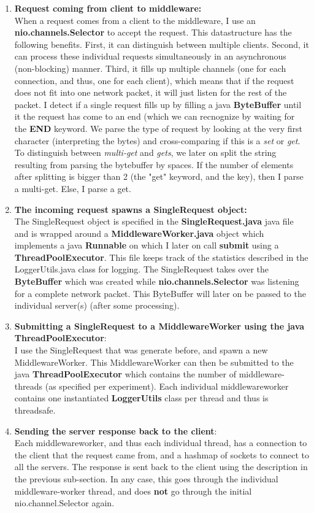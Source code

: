 \documentclass[11pt,a4paper]{article}
\begin{document}
\begin{enumerate}
\item \textbf{Request coming from client to middleware:}\\
When a request comes from a client to the middleware, I use an \textbf{nio.channels.Selector} to accept the request.
This datastructure has the following benefits.
First, it can distinguish between multiple clients.
Second, it can process these individual requests simultaneously in an asynchronous (non-blocking) manner.
Third, it fills up multiple channels (one for each connection, and thus, one for each client), which means that if the request does not fit into one network packet, it will just listen for the rest of the packet.
I detect if a single request fills up by filling a java \textbf{ByteBuffer} until it the request has come to an end (which we can recnognize by waiting for the \textbf{END} keyword.
We parse the type of request by looking at the very first character (interpreting the bytes) and cross-comparing if this is a \textit{set} or \textit{get}. 
To distinguish between \textit{multi-get} and \textit{gets}, we later on split the string resulting from parsing the bytebuffer by spaces.
If the number of elements after splitting is bigger than 2 (the "get" keyword, and the key), then I parse a multi-get.
Else, I parse a get.
\item \textbf{The incoming request spawns a SingleRequest object:}\\
The SingleRequest object is specified in the \textbf{SingleRequest.java} java file and is wrapped around a \textbf{MiddlewareWorker.java} object which implements a java \textbf{Runnable} on which I later on call \textbf{submit} using a \textbf{ThreadPoolExecutor}. 
This file keeps track of the statistics described in the LoggerUtils.java class for logging.
The SingleRequest takes over the \textbf{ByteBuffer} which was created while \textbf{nio.channels.Selector} was listening for a complete network packet.
This ByteBuffer will later on be passed to the individual server(s) (after some processing).
\item \textbf{Submitting a SingleRequest to a MiddlewareWorker using the java ThreadPoolExecutor}:\\
I use the SingleRequest that was generate before, and spawn a new MiddlewareWorker.
This MiddlewareWorker can then be submitted to the java \textbf{ThreadPoolExecutor} which contains the number of middleware-threads (as specified per experiment).
Each individual middlewareworker contains one instantiated \textbf{LoggerUtils} class per thread and thus is threadsafe.
\item \textbf{Sending the server response back to the client}: \\
Each middlewareworker, and thus each individual thread, has a connection to the client that the request came from, and a hashmap of sockets to connect to all the servers.
The response is sent back to the client using the description in the previous sub-section.
In any case, this goes through the individual middleware-worker thread, and does \textbf{not} go through the initial nio.channel.Selector again.
\end{enumerate}
\end{document}
